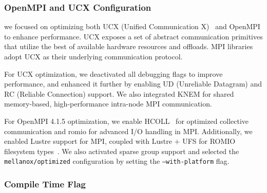 \subsubsection{OpenMPI and UCX Configuration}

we focused on optimizing both UCX (Unified Communication X)~\cite{ucx} and OpenMPI to enhance performance. UCX exposes a set of abstract communication primitives that utilize the best of available hardware resources and offloads. MPI libraries adopt UCX as their underlying communication protocol.

For UCX optimization, we deactivated all debugging flags to improve performance, and enhanced it further by enabling UD (Unreliable Datagram) and RC (Reliable Connection) support. We also integrated KNEM for shared memory-based, high-performance intra-node MPI communication.

For OpenMPI 4.1.5 optimization, we enable HCOLL~\cite{hcoll} for optimized collective communication and romio for advanced I/O handling in MPI. Additionally, we enabled Lustre support for MPI, coupled with Lustre $+$ UFS for ROMIO filesystem types~\cite{ROMIO}. We also activated sparse group support and selected the \texttt{mellanox/optimized} configuration by setting the \texttt{--with-platform} flag.


\subsubsection{Compile Time Flag}

